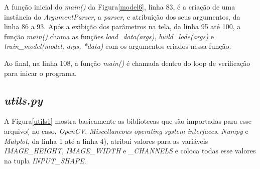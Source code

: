 A função inicial do \textit{main()} da Figura\ref{model6}, linha 83,  é a criação de uma instância do \textit{ArgumentParser}, a \textit{parser}, e atribuição dos seus argumentos, da linha 86 a 93.
Após a exibição dos parâmetros na tela, da linha 95 até 100, a função \textit{main()} chama as funções \textit{load\_data(args)}, \textit{build\_lode(args)} e \textit{train\_model(model, args, *data)} com os argumentos criados nessa função.

Ao final, na linha 108, a função \textit{main()} é chamada dentro do loop de verificação para inicar o programa.

\subsection{\textit{utils.py}}
\label{sec:utils.py}

	\begin{figure}[H]
		\centering
\end{figure}
A Figura\ref{utils1} mostra basicamente as bibliotecas que são importadas para esse arquivo( no caso, \textit{OpenCV}, \textit{Miscellaneous operating system interfaces}, \textit{Numpy} e \textit{Matplot}, da linha 1 até a linha 4), atribui valores para as variáveis \textit{IMAGE\_HEIGHT}, \textit{IMAGE\_WIDTH} e \textit{\IMAGE\_CHANNELS} e coloca todas esse valores na tupla \textit{INPUT\_SHAPE}.


\begin{figure}[H]
	\centering
\end{figure}

